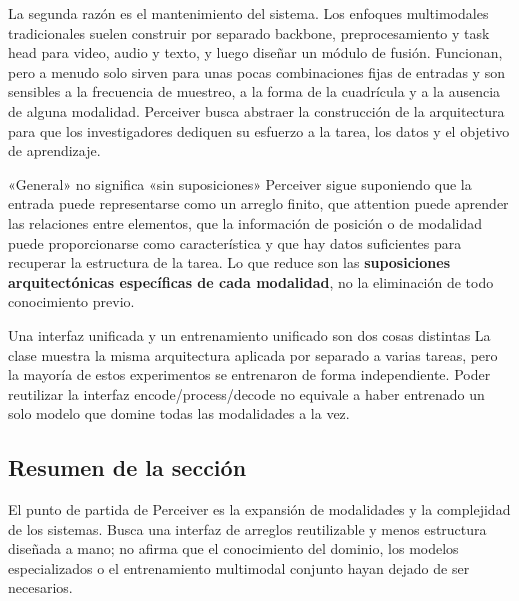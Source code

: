 
La segunda razón es el mantenimiento del sistema. Los enfoques multimodales tradicionales suelen construir por separado backbone, preprocesamiento y task head para video, audio y texto, y luego diseñar un módulo de fusión. Funcionan, pero a menudo solo sirven para unas pocas combinaciones fijas de entradas y son sensibles a la frecuencia de muestreo, a la forma de la cuadrícula y a la ausencia de alguna modalidad. Perceiver busca abstraer la construcción de la arquitectura para que los investigadores dediquen su esfuerzo a la tarea, los datos y el objetivo de aprendizaje.


\begin{importantbox}{«General» no significa «sin suposiciones»}
Perceiver sigue suponiendo que la entrada puede representarse como un arreglo finito, que attention puede aprender las relaciones entre elementos, que la información de posición o de modalidad puede proporcionarse como característica y que hay datos suficientes para recuperar la estructura de la tarea. Lo que reduce son las \textbf{suposiciones arquitectónicas específicas de cada modalidad}, no la eliminación de todo conocimiento previo.
\end{importantbox}

\begin{warningbox}{Una interfaz unificada y un entrenamiento unificado son dos cosas distintas}
La clase muestra la misma arquitectura aplicada por separado a varias tareas, pero la mayoría de estos experimentos se entrenaron de forma independiente. Poder reutilizar la interfaz encode/process/decode no equivale a haber entrenado un solo modelo que domine todas las modalidades a la vez.
\end{warningbox}

\subsection{Resumen de la sección}

El punto de partida de Perceiver es la expansión de modalidades y la complejidad de los sistemas. Busca una interfaz de arreglos reutilizable y menos estructura diseñada a mano; no afirma que el conocimiento del dominio, los modelos especializados o el entrenamiento multimodal conjunto hayan dejado de ser necesarios.
